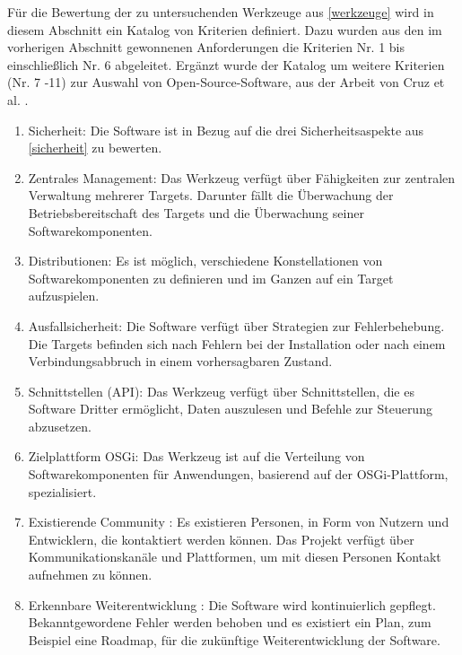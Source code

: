 Für die Bewertung der zu untersuchenden Werkzeuge aus \autoref{werkzeuge} wird in diesem Abschnitt ein Katalog von Kriterien definiert.
Dazu wurden aus den im vorherigen Abschnitt gewonnenen Anforderungen die Kriterien Nr. 1 bis einschließlich Nr. 6 abgeleitet.
Ergänzt wurde der Katalog um weitere Kriterien (Nr. 7 -11) zur Auswahl von Open-Source-Software, aus der Arbeit von Cruz et al. \cite{evaluation_criteria}. 


\begin{enumerate}[label={Nr. \arabic*}, leftmargin=*, labelindent=1em]
 \item Sicherheit: Die Software ist in Bezug auf die drei Sicherheitsaspekte aus \autoref{sicherheit} zu bewerten.
 
 \item Zentrales Management: Das Werkzeug verfügt über Fähigkeiten zur zentralen Verwaltung mehrerer Targets. Darunter fällt die Überwachung der Betriebsbereitschaft
 des Targets und die Überwachung seiner Softwarekomponenten.
 
 \item Distributionen: Es ist möglich, verschiedene Konstellationen von Softwarekomponenten zu definieren und im Ganzen auf ein Target aufzuspielen. 

 \item Ausfallsicherheit: Die Software verfügt über Strategien zur Fehlerbehebung. Die Targets befinden sich nach Fehlern bei der Installation
 oder nach einem Verbindungsabbruch in einem vorhersagbaren Zustand.
 
 \item Schnittstellen (\ac{API}): Das Werkzeug verfügt über Schnittstellen, die es Software Dritter ermöglicht, Daten auszulesen und 
 Befehle zur Steuerung abzusetzen.
 
 \item Zielplattform \ac{OSGi}: Das Werkzeug ist auf die Verteilung von Softwarekomponenten für Anwendungen, basierend auf der \ac{OSGi}-Plattform, spezialisiert.

 \item Existierende Community \cite{evaluation_criteria}: Es existieren Personen, in Form von Nutzern 
  und Entwicklern, die kontaktiert werden können.
  Das Projekt verfügt über Kommunikationskanäle und Plattformen, um mit diesen Personen Kontakt aufnehmen zu können.
 
 \item Erkennbare Weiterentwicklung \cite{evaluation_criteria}: Die Software wird kontinuierlich gepflegt. 
  Bekanntgewordene Fehler werden behoben und es existiert ein Plan, zum Beispiel eine Roadmap, für die zukünftige Weiterentwicklung der Software.
 

\end{enumerate}
